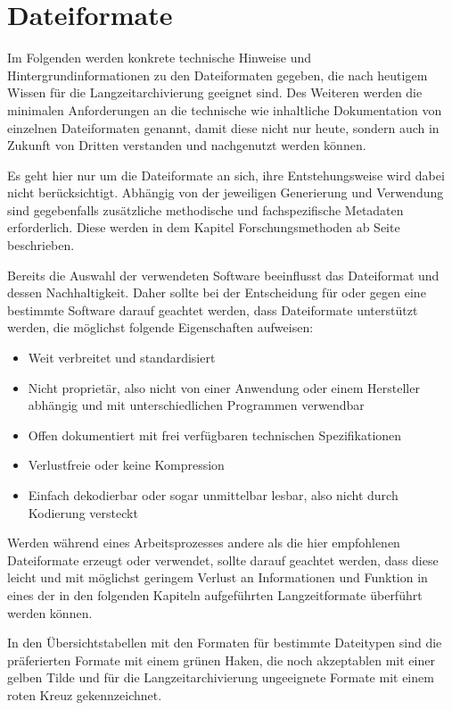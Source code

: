 \chapter{Dateiformate}
	\label{dateiformate}
Im Folgenden werden konkrete technische Hinweise und Hintergrundinformationen zu den Dateiformaten gegeben, die nach heutigem Wissen für die Langzeitarchivierung geeignet sind. Des Weiteren werden die minimalen Anforderungen an die technische wie inhaltliche Dokumentation von einzelnen Dateiformaten genannt, damit diese nicht nur heute, sondern auch in Zukunft von Dritten verstanden und nachgenutzt werden können.

Es geht hier nur um die Dateiformate an sich, ihre Entstehungsweise wird dabei nicht berücksichtigt. Abhängig von der jeweiligen Generierung und Verwendung sind gegebenfalls zusätzliche methodische und fachspezifische Metadaten erforderlich. Diese werden in dem Kapitel Forschungsmethoden ab Seite \pageref{methoden} beschrieben.

Bereits die Auswahl der verwendeten Software beeinflusst das Dateiformat und dessen Nachhaltigkeit. Daher sollte bei der Entscheidung für oder gegen eine bestimmte Software darauf geachtet werden, dass Dateiformate unterstützt werden, die möglichst folgende Eigenschaften aufweisen:
\begin{itemize}
	\item Weit verbreitet und standardisiert
	\item Nicht proprietär, also nicht von einer Anwendung oder einem Hersteller abhängig und mit unterschiedlichen Programmen verwendbar
	\item Offen dokumentiert mit frei verfügbaren technischen Spezifikationen
	\item Verlustfreie oder keine Kompression
	\item Einfach dekodierbar oder sogar unmittelbar lesbar, also nicht durch Kodierung versteckt
\end{itemize} 

Werden während eines Arbeitsprozesses andere als die hier empfohlenen Dateiformate erzeugt oder verwendet, sollte darauf geachtet werden, dass diese leicht und mit möglichst geringem Verlust an Informationen und Funktion in eines der in den folgenden Kapiteln aufgeführten Langzeitformate überführt werden können. 

In den Übersichtstabellen mit den Formaten für bestimmte Dateitypen sind die präferierten Formate mit einem grünen Haken, die noch akzeptablen mit einer gelben Tilde und für die Langzeitarchivierung ungeeignete Formate mit einem roten Kreuz gekennzeichnet.

